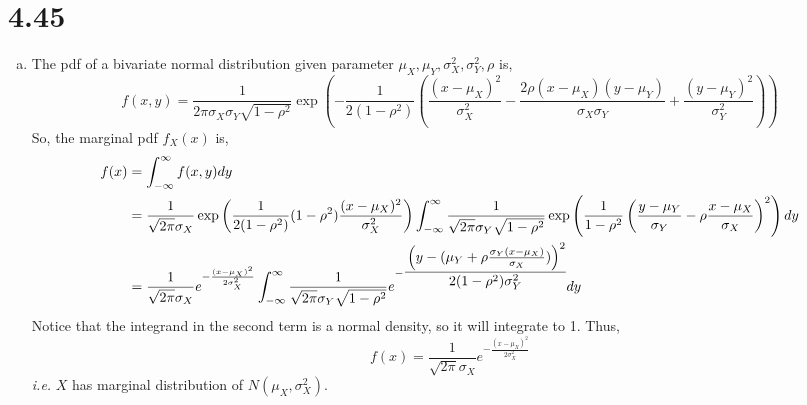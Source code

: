 \documentclass[letterpaper]{article}
\newcommand{\intii}{\int_{-\infty}^\infty}
\begin{document}
    \section*{4.45}
    \begin{enumerate}[(a)]
    \item The pdf of a bivariate normal distribution given parameter $\mu_X, \mu_Y, \sigma_X^2, \sigma^2_Y, \rho$ is,
    \[
    f(x, y) = \frac{1}{2\pi\sigma_X\sigma_Y \sqrt{1-\rho^2}} \exp\left(-\frac{1}{2(1-\rho^2)} \left(\frac{(x-\mu_X)^2}{\sigma_X^2} - \frac{2\rho(x-\mu_X)(y-\mu_Y)}{\sigma_X \sigma_Y} + \frac{(y-\mu_Y)^2}{\sigma_Y^2}\right) \right)
    \]
    So, the marginal pdf $f_X(x)$ is,
    \begin{align*}
    f(x) & = \intii f(x,y) dy \\
    & = \frac{1}{\sqrt{2\pi}\sigma_X} \exp\left(\frac{1}{2(1-\rho^2)} (1-\rho^2)\frac{(x-\mu_X)^2}{\sigma_X^2}\right) \intii \frac{1}{\sqrt{2\pi}\sigma_Y \sqrt{1-\rho^2}} \exp \left(\frac{1}{1-\rho^2} \left( \frac{y-\mu_Y}{\sigma_Y} - \rho \frac{x-\mu_X}{\sigma_X} \right)^2 \right) dy \\
    & = \frac{1}{\sqrt{2\pi}\sigma_X} e^{-\frac{(x-\mu_X)^2}{2\sigma_X^2}} \intii \frac{1}{\sqrt{2\pi}\sigma_Y \sqrt{1-\rho^2}} e^{-\cfrac{\left(y-(\mu_Y +\rho \frac{\sigma_Y(x-\mu_X)}{\sigma_X}) \right)^2}{2(1-\rho^2)\sigma_Y^2}  } dy \\
    \end{align*}
    Notice that the integrand in the second term is a normal density, so it will integrate to 1. Thus, 
    \[
    f(x) = \frac{1}{\sqrt{2\pi}\sigma_X} e^{-\frac{(x-\mu_X)^2}{2\sigma_X^2}}
    \]
    \emph{i.e.} $X$ has marginal distribution of $N(\mu_X, \sigma_X^2)$.


\end{enumerate}
\end{document}
